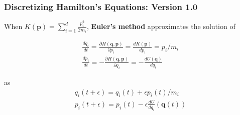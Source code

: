 \documentclass{beamer}
\begin{document}
\begin{frame}
\frametitle{Discretizing Hamilton's Equations: Version 1.0}

When $K(\mathbf{p})= \sum_{i=1}^d \frac{p_i^2}{2m_i}$, {\bf Euler's method} approximates the solution of

\begin{gather}
\frac{dq_i}{dt} = \frac{\partial H(\mathbf{q},\mathbf{p})}{\partial p_i} =  \frac{d K(\mathbf{p}) }{d p_i} = p_i/m_i  \\
\frac{dp_i}{dt} = -\frac{\partial H(\mathbf{q},\mathbf{p})}{\partial q_i} = -\frac{d U(\mathbf{q})}{d q_i} 
\end{gather}

as 
\begin{gather}
q_i(t + \epsilon) =  q_i(t ) + \epsilon p_i(t)/m_i \\
p_i(t + \epsilon) =  p_i(t) - \epsilon \frac{d U}{d q_i}(\mathbf{q}(t))  
\end{gather}


\end{frame}
\end{document}

